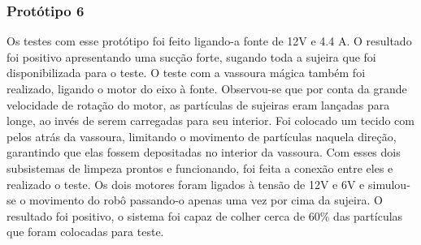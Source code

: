 \subsubsection{Protótipo 6}
Os testes com esse protótipo foi feito ligando-a fonte de 12V e 4.4 A. O resultado foi positivo apresentando uma sucção forte, sugando toda a sujeira que foi disponibilizada para o teste. O teste com a vassoura mágica também foi realizado, ligando o motor do eixo à fonte. Observou-se que por conta da grande velocidade de rotação do motor, as partículas de sujeiras eram lançadas para longe, ao invés de serem carregadas para seu interior. Foi colocado um tecido com pelos atrás da vassoura, limitando o movimento de partículas naquela direção, garantindo que elas fossem depositadas no interior da vassoura. Com esses dois subsistemas de limpeza prontos e funcionando, foi feita a conexão entre eles e realizado o teste. Os dois motores foram ligados à tensão de 12V e 6V e simulou-se o movimento do robô passando-o apenas uma vez por cima da sujeira. O resultado foi positivo, o sistema foi capaz de colher cerca de 60\% das partículas que foram colocadas para teste.
